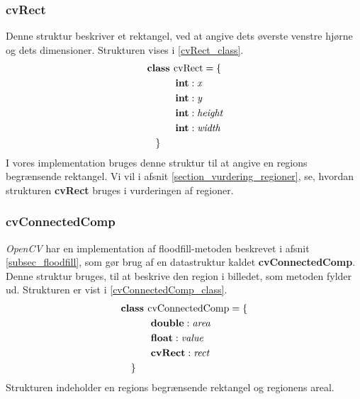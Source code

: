 {\subsubsection{cvRect}
Denne struktur beskriver et rektangel, ved at angive dets øverste venstre
hjørne og dets dimensioner. Strukturen vises i \eqref{cvRect_class}.
\begin{multline}
    \textbf{class~} \textrm{cvRect} = \{ \\
    \shoveleft{\qquad\textbf{int} : \textit{x}} \\
    \shoveleft{\qquad\textbf{int} : \textit{y}} \\
    \shoveleft{\qquad\textbf{int} : \textit{height}} \\
    \shoveleft{\qquad\textbf{int} : \textit{width}} \\
    \shoveleft{\}}\shoveright{}
    \label{cvRect_class}
\end{multline}
I vores implementation bruges denne struktur til at angive en regions
begrænsende rektangel. Vi vil i afsnit \ref{section_vurdering_regioner},
se, hvordan strukturen \textbf{cvRect} bruges i vurderingen af regioner.

\subsubsection{cvConnectedComp}
\emph{OpenCV} har en implementation af floodfill-metoden beskrevet i
afsnit \ref{subsec_floodfill}, som gør brug af en datastruktur kaldet
\textbf{cvConnectedComp}. Denne struktur bruges, til at beskrive den
region i billedet, som metoden fylder ud.  Strukturen er vist i
\eqref{cvConnectedComp_class}.
\begin{multline}
    \textbf{class~} \textrm{cvConnectedComp} = \{ \\
    \shoveleft{\qquad\textbf{double} : \textit{area}} \\
    \shoveleft{\qquad\textbf{float} : \textit{value}} \\
    \shoveleft{\qquad\textbf{cvRect} : \textit{rect}} \\
    \shoveleft{\}}\shoveright{}
    \label{cvConnectedComp_class}
\end{multline}
Strukturen indeholder en regions begrænsende rektangel og regionens
areal.

}
